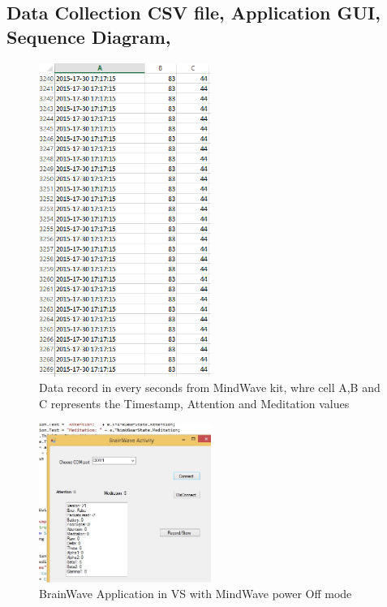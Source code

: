 \documentclass{bioinfo}
\begin{document}
%
%
%
%
%

%

\newpage
\begin{appendices}
\chapter{Data Collection CSV file, Application GUI, Sequence Diagram, }

\begin{figure}[ht!]
\includegraphics[width=0.5\textwidth]{BrainWaveDataToCSV}
\caption{Data record in every seconds from MindWave kit, whre cell A,B and C represents the Timestamp, Attention and Meditation values}
\end{figure}

\begin{figure}[ht!]
\includegraphics[width=0.5\textwidth]{GUI_BrainWave.jpg}
\caption{BrainWave Application in VS with MindWave power Off mode}
\end{figure}


\end{appendices}
\end{document}
